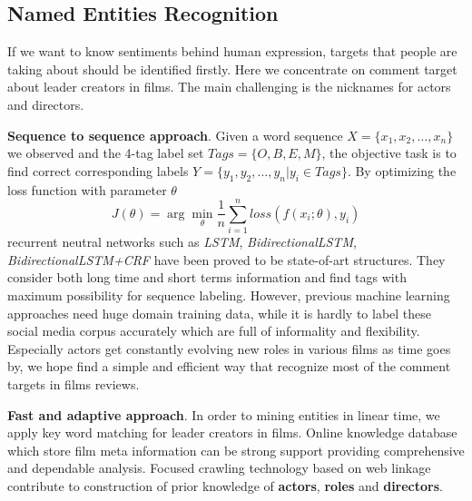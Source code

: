 \subsection{Named Entities Recognition}
\par If we want to know sentiments behind human expression, targets that people are taking about should be identified firstly. Here we concentrate on comment target about leader creators in films. The main challenging is the nicknames for actors and directors.
\par \textbf{Sequence to sequence approach}. Given a word sequence $X=\{x_1, x_2, \dots, x_n\}$ we observed and the 4-tag label set $Tags=\{O,B,E,M\}$, the objective task is to find correct corresponding labels $Y=\{y_1, y_2, \dots, y_n | y_i \in Tags\} $. By optimizing the loss function with parameter $ \theta $
\begin{equation}
    J(\theta)= \arg\min_{\theta} \frac{1}{n}\sum_{i=1}^{n}loss(f(x_i;\theta), y_i)
\end{equation}
recurrent neutral networks such as \emph{LSTM}, \emph{BidirectionalLSTM}, \emph{BidirectionalLSTM+CRF} have been proved to be state-of-art structures. They consider both long time and short terms information and find tags with maximum possibility for sequence labeling. However, previous machine learning approaches need huge domain training data, while it is hardly to label these social media corpus accurately which are full of informality and flexibility. Especially actors get constantly evolving new roles in various films as time goes by, we hope find a simple and efficient way that recognize most of the comment targets in films reviews.
\par \textbf{Fast and adaptive approach}. In order to mining entities in linear time, we apply key word matching for leader creators in films. Online knowledge database which store film meta information can be strong support providing comprehensive and dependable analysis. Focused crawling technology based on web linkage contribute to construction of prior knowledge of \textbf{actors}, \textbf{roles} and \textbf{directors}.

